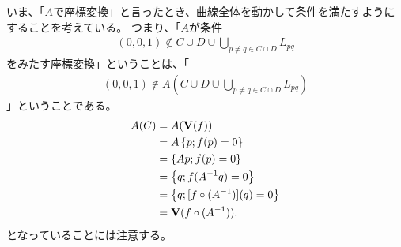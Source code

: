 いま、「$A$で座標変換」と言ったとき、曲線全体を動かして条件を満たすようにすることを考えている。
つまり、「$A$が条件
\begin{align}
  (0,0,1)\notin C\cup D \cup \bigcup_{p\neq q \in C\cap D}L_{pq}
\end{align}
をみたす座標変換」ということは、「
\begin{align}
  (0,0,1) \notin A(C\cup D \cup \bigcup_{p\neq q \in C\cap D}L_{pq})
\end{align}
」ということである。
\begin{align}
  A(C) &=
  A(\textbf V(f)) \\
  &=
  A\left\{p; f(p)=0\right\}\\
  &=
  \left\{Ap; f(p)=0\right\}\\
  &=
  \left\{q; f(A^{-1} q)=0\right\}\\
  &=
  \left\{q; [f\circ (A^{-1})](q)=0\right\}\\
  &=
  \textbf V(f\circ (A^{-1})).
\end{align}
となっていることには注意する。

